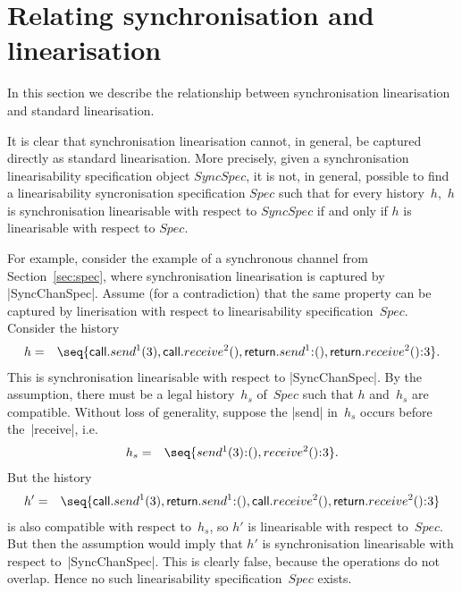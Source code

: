 \section{Relating synchronisation and linearisation}

In this section we describe the relationship between synchronisation
linearisation and standard linearisation.  

\framebox{\ldots}

It is clear that synchronisation linearisation cannot, in general, be captured
directly as standard linearisation.  More precisely, given a synchronisation
linearisability specification object $SyncSpec$, it is not, in general,
possible to find a linearisability syncronisation specification $Spec$ such
that for every history~$h$,\, $h$ is synchronisation linearisable with respect
to $SyncSpec$ if and only if $h$ is linearisable with respect to $Spec$.

For example, consider the example of a synchronous channel from
Section~\ref{sec:spec}, where synchronisation linearisation is captured by
|SyncChanSpec|.  Assume (for a contradiction) that the same property can be
captured by linerisation with respect to linearisability specification~$Spec$.
Consider the history
\begin{eqnarray*}
h & = & \seq{ 
  \call.send^1(3), \call.receive^2(), 
  \return.send^1\::(), \return.receive^2()\::3 }.
\end{eqnarray*}
%
This is synchronisation linearisable with respect to |SyncChanSpec|.  By the
assumption, there must be a legal history~$h_s$ of~$Spec$ such that $h$
and~$h_s$ are compatible.  Without loss of generality, suppose the |send|
in~$h_s$ occurs before the~|receive|, i.e.
\begin{eqnarray*}
h_s & = & \seq{ send^1(3)\::(), receive^2()\::3 }.
\end{eqnarray*}
%
But the history
%
\begin{eqnarray*}
h' & = & \seq{ 
  \call.send^1(3), \return.send^1\::(), 
  \call.receive^2(), \return.receive^2()\::3 }
\end{eqnarray*}
%
is also compatible with respect to~$h_s$, so $h'$ is linearisable with respect
to~$Spec$.  But then the assumption would imply that $h'$ is synchronisation
linearisable with respect to~|SyncChanSpec|.  This is clearly false, because
the operations do not overlap.  Hence no such  linearisability
specification~$Spec$ exists.



